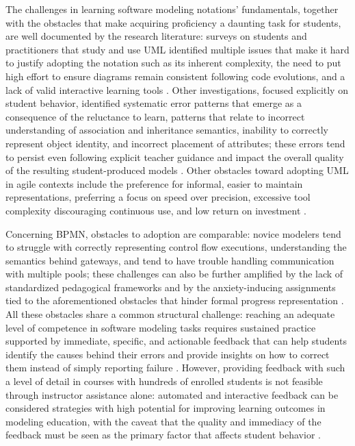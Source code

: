 The challenges in learning software modeling notations' fundamentals, together with the obstacles that make acquiring proficiency a daunting task for students, are well documented by the research literature: surveys on students and practitioners that study and use UML identified multiple issues that make it hard to justify adopting the notation such as its inherent complexity, the need to put high effort to ensure diagrams remain consistent following code evolutions, and a lack of valid interactive learning tools \cite{siau2006identifying}. Other investigations, focused explicitly on student behavior, identified systematic error patterns that emerge as a consequence of the reluctance to learn, patterns that relate to incorrect understanding of association and inheritance semantics, inability to correctly represent object identity, and incorrect placement of attributes; these errors tend to persist even following explicit teacher guidance and impact the overall quality of the resulting student-produced models \cite{boustedt2012students}. Other obstacles toward adopting UML in agile contexts include the preference for informal, easier to maintain representations, preferring a focus on speed over precision, excessive tool complexity discouraging continuous use, and low return on investment \cite{stettina2012documentation, oliveirajr2025uml}.

Concerning BPMN, obstacles to adoption are comparable: novice modelers tend to struggle with correctly representing control flow executions, understanding the semantics behind gateways, and tend to have trouble handling communication with multiple pools; these challenges can also be further amplified by the lack of standardized pedagogical frameworks and by the anxiety-inducing assignments tied to the aforementioned obstacles that hinder formal progress representation \cite{bandara2010bpm, maslov2022towards}. All these obstacles share a common structural challenge: reaching an adequate level of competence in software modeling tasks requires sustained practice supported by immediate, specific, and actionable feedback that can help students identify the causes behind their errors and provide insights on how to correct them instead of simply reporting failure \cite{bogdanova2019towards}. However, providing feedback with such a level of detail in courses with hundreds of enrolled students is not feasible through instructor assistance alone: automated and interactive feedback can be considered strategies with high potential for improving learning outcomes in modeling education, with the caveat that the quality and immediacy of the feedback must be seen as the primary factor that affects student behavior \cite{huber2022tool}.

